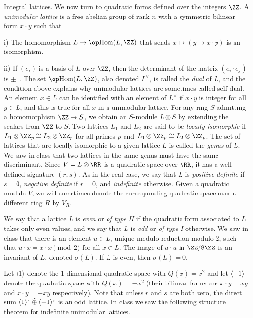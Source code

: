 \boldlabel Integral lattices. We now turn to quadratic forms defined over the integers $\ZZ$. A
{\it unimodular lattice}
is a free abelian group of rank $n$ with a symmetric bilinear form $x\cdot y$ such that
\medskip
\item{i)} The homomorphism $L\to \Hom(L,\ZZ)$ that sends $x\mapsto (y\mapsto x\cdot y)$ is an isomorphism.
\smallskip
\item{ii)} If $(e_i)$ is a basis of $L$ over $\ZZ$, then the determinant of the matrix $(e_i\cdot e_j)$
is $\pm 1$.
\medskip
The set $\Hom(L,\ZZ)$, also denoted $L^\vee$,
is called the {\it dual} of $L$, and the condition above explains why
unimodular lattices are sometimes called self-dual. An element $x\in L$ can be identified with an element
of $L^\vee$ if $x\cdot y$ is integer for all $y\in L$, and this is true for all $x$ in a unimodular lattice.
For any ring $S$ admitting a homomorphism $\ZZ\to S$, we obtain an $S$-module $L\otimes S$ by extending
the scalars from $\ZZ$ to $S$. Two lattices $L_1$ and $L_2$ are said to be {\it locally isomorphic}
if $L_1\otimes \ZZ_p\cong L_2\otimes \ZZ_p$ for all primes $p$ and $L_1\otimes \ZZ_p\cong L_2\otimes \ZZ_p$.
The set of lattices that are locally isomorphic to a given lattice $L$ is called the {\it genus} of $L$.
We saw in class that two lattices in the same genus must have the same discriminant.
Since $V = L\otimes \RR$ is a quadratic space over $\RR$, it has a well
defined signature $(r,s)$. As in the real case, we say that $L$ is {\it positive definite} if $s=0$,
{\it negative definite} if $r=0$, and {\it indefinite} otherwise. Given a quadratic module $V$, we will sometimes
denote the corresponding quadratic space over a different ring $R$ by $V_R$.

We say that a lattice $L$ is {\it even} or {\it of type {\rm II}} if the quadratic form associated to $L$
takes only even values, and we say that $L$ is {\it odd} or {\it of type {\rm I}} otherwise. We saw in
class that there is an element $u\in L$, unique modulo reduction modulo $2$, such that
$u\cdot x = x\cdot x \pmod 2$ for all $x\in L$. The image of $u\cdot u$ in $\ZZ/8\ZZ$ is an invariant of
$L$, denoted $\sigma(L)$. If $L$ is even, then $\sigma(L) = 0$.

Let $\langle 1\rangle$ denote the $1$-dimensional quadratic space with $Q(x)=x^2$ and let $\langle-1\rangle$
denote the quadratic space with $Q(x) = -x^2$ (their bilinear forms are $x\cdot y = xy$ and $x\cdot y = -xy$
respectively).
Note that unless $r$ and $s$ are both zero, the direct sum
$\langle 1\rangle^r \mathbin{\widehat\oplus} \langle -1\rangle^s$ is an odd lattice. In class we saw the following structure
theorem for indefinite unimodular lattices.

